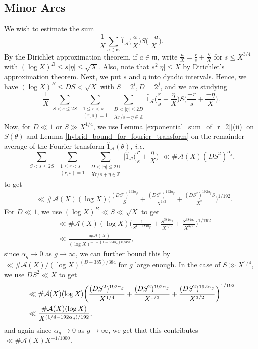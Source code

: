 \documentclass[12pt]{amsart}
\theoremstyle{definition}
\theoremstyle{definition}
\theoremstyle{remark}
\numberwithin{equation}{section}
\newcommand{\Z}{\mathbb{Z}}
\newcommand{\CA}{\mathcal{A}}
\newcommand{\m}{\mathfrak{m}}
\renewcommand{\leq}{\leqslant}
\renewcommand{\hat}{\widehat}
\begin{document}
\subsection{Minor Arcs}
We wish to estimate the sum
$$ \frac{1}{X} \sum_{a\in \m} \hat{1}_{\CA}\bigg(\frac{a}{X}\bigg) S\bigg(\frac{-a}{X}\bigg)  . $$
By the Dirichlet approximation theorem, if $a\in \m$, write $\frac{a}{X} = \frac{r}{s} + \frac{\eta}{X}$ for $s\leq X^{3/4}$ with $(\log X)^B \leq s|\eta| \leq \sqrt{X}$. Also, note that $s^2 |\eta|\leq X$ by Dirichlet's approximation theorem.
Next, we put $s$ and $\eta$ into dyadic intervals. Hence, we have $(\log X)^B \leq DS < \sqrt{X}$ with $S=2^i, D=2^j$, and we are studying
$$ \frac{1}{X} \sum_{\substack{S<s\leq 2S}}\sum_{\substack{1 \leq r < s  \\ (r,s)=1}} \sum_{\substack{D<|\eta| \leq 2D \\ Xr/s+\eta\in \Z}} \hat{1}_{\CA}\bigg(\frac{r}{s}+ \frac{\eta}{X}\bigg) S\bigg(\frac{-r}{s} + \frac{-\eta}{X}\bigg). $$
Now, for $D\ll 1$ or $S\gg X^{1/4}$, we use Lemma \ref{exponential_sum_of_r_2}[(ii)] on $S(\theta)$ and Lemma \ref{hybrid_bound_for_fourier_transform} on the remainder average of the Fourier transform $\hat{1}_{\CA}(\theta)$, \textit{i.e.}
$$ \sum_{\substack{S<s\leq 2S}}\sum_{\substack{1 \leq r < s  \\ (r,s)=1}} \sum_{\substack{D<|\eta| \leq 2D \\ Xr/s+\eta\in \Z}} \bigg| \hat{1}_{\CA}\bigg( \frac{r}{s} + \frac{\eta}{X}\bigg)\bigg| \ll \#\CA(X) (DS^2)^{\alpha_g}, $$
to get
\begin{align*}
&\ll \#\CA(X) (\log X) \bigg( \frac{(DS^2)^{192\alpha_g}}{S} + \frac{(DS^2)^{192\alpha_g}}{X^{1/3}} + \frac{(DS^2)^{192\alpha_g}S}{X^2} \bigg)^{1/192}.
\end{align*}
For $D\ll 1$, we use $(\log X)^B\ll S\ll \sqrt{X}$ to get
\begin{align}
&\ll \#\CA(X) (\log X) \bigg( \frac{1}{S^{1-384\alpha_g}} + \frac{S^{384\alpha_g}}{X^{1/3}} + \frac{S^{384\alpha_g}}{X^{3/2}} \bigg)^{1/192} \nonumber \\
&\ll \frac{\#\CA(X)}{(\log X)^{-1+(1-384\alpha_g)B/384}}, \label{good_bound}
\end{align}
since $\alpha_g \to 0$ as $g\to \infty$, we can further bound this by $\ll \#\CA(X) / (\log X)^{(B-385)/384}$ for $g$ large enough. In the case of $S\gg X^{1/4}$, we use $DS^2\ll X$ to get
\begin{align}
&\ll \#\CA(X) (\log X) \bigg( \frac{(DS^2)^{192\alpha_g}}{X^{1/4}} + \frac{(DS^2)^{192\alpha_g}}{X^{1/3}} + \frac{(DS^2)^{192\alpha_g}}{X^{3/2}} \bigg)^{1/192} \notag \\
&\ll \frac{\#\CA(X) (\log X)}{X^{(1/4-192\alpha_g)/192}},\label{worst_bound}
\end{align}
and again since $\alpha_g\to 0 $ as $g\to\infty$, we get that this contributes $\ll \#\CA(X) X^{-1/1000}$.
\end{document}
